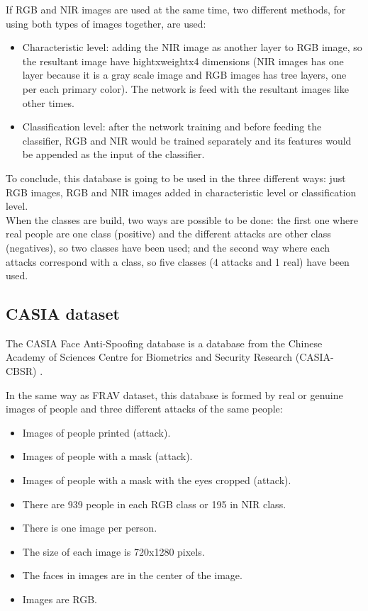 If RGB and NIR images are used at the same time, two different methods, for using both types of images together, are used:
\begin{itemize}
\item Characteristic level: adding the NIR image as another layer to RGB image, so the resultant image have hightxweightx4 dimensions (NIR images has one layer because it is a gray scale image and RGB images has tree layers, one per each primary color). The network is feed with the resultant images like other times.
\item Classification level: after the network training and before feeding the classifier, RGB and NIR would be trained separately and its features would be appended as the input of the classifier. 
\end{itemize}

To conclude, this database is going to be used in the three different ways: just RGB images, RGB and NIR images added in characteristic level or classification level.\\ 

When the classes are build, two ways are possible to be done: the first one where real people are one class (positive) and the different attacks are other class (negatives), so two classes have been used; and the second way where each attacks correspond with a class, so five classes (4 attacks and 1 real) have been used.\\


\subsection{CASIA dataset}
The CASIA Face Anti-Spoofing database is a database from the Chinese Academy of Sciences Centre for Biometrics and Security Research (CASIA-CBSR) \cite{Casiadatbase}.


In the same way as FRAV dataset, this database is formed by real or genuine images of people and three different attacks of the same people:

\begin{itemize}
 \item Images of people printed (attack).
 \item Images of people with a mask (attack).
 \item Images of people with a mask with the eyes cropped (attack).
 \end{itemize}


\begin{itemize}
\item There are 939 people in each RGB class or 195 in NIR class.
\item There is one image per person.
\item The size of each image is 720x1280 pixels.
\item The faces in images are in the center of the image.\\
\item Images are RGB.
\end{itemize}


